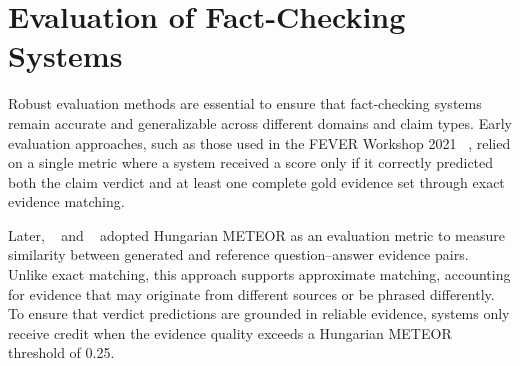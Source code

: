 \begin{table}[ht]
\centering
\caption{Comparison of AVerImaTeC Competition Systems}
\label{tab:competition-systems-comparison}

\end{table}




\section{Evaluation of Fact-Checking Systems}

Robust evaluation methods are essential to ensure that fact-checking systems remain accurate and generalizable across different domains and claim types. Early evaluation approaches, such as those used in the FEVER Workshop 2021 ~\cite{Aly2021Nov}, relied on a single metric where a system received a score only if it correctly predicted both the claim verdict and at least one complete gold evidence set through exact evidence matching.

Later, ~\citet{Schlichtkrull2023May} and ~\citet{Schlichtkrull2024Nov} adopted Hungarian METEOR as an evaluation metric to measure similarity between generated and reference question–answer evidence pairs. Unlike exact matching, this approach supports approximate matching, accounting for evidence that may originate from different sources or be phrased differently. To ensure that verdict predictions are grounded in reliable evidence, systems only receive credit when the evidence quality exceeds a Hungarian METEOR threshold of 0.25.

